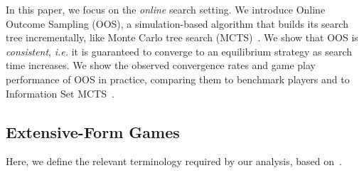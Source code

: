 \documentclass[letterpaper]{article}
\newcommand{\ie}{{\it i.e.}\xspace}
\newcounter{vlNoteCounter}
\newcommand{\vlnote}[1]{{\scriptsize \color{blue} $\blacksquare$ \refstepcounter{vlNoteCounter}\textsf{[VL]$_{\arabic{vlNoteCounter}}$:{#1}}}}
\begin{document}
In this paper, we focus on the {\it online} search setting. 
We introduce Online Outcome Sampling (OOS), a simulation-based algorithm that builds its search tree incrementally, 
like Monte Carlo tree search (MCTS)~\cite{Coulom06Efficient,UCT,mctssurvey}. 
We show that OOS is {\it consistent}, \ie it is guaranteed to converge to an equilibrium strategy as search 
time increases. %
We show the observed convergence rates and game play performance of OOS in practice, comparing them to benchmark
players and to Information Set MCTS~\cite{Cowling12ISMCTS}. 


\subsection{Extensive-Form Games}


Here, we define the relevant terminology required by our analysis, based on~\cite{OsbRub94}. 
\end{document}
